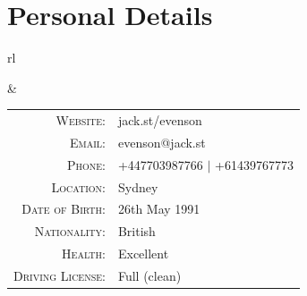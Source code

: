 \section*{Personal Details}

\begin{tabular}{rl}


&

\begin{tabular}{rl}
\textsc{Website:} & jack.st/evenson \\
\textsc{Email:} & evenson@jack.st \\
\textsc{Phone:} & +447703987766 $|$ +61439767773\\
\textsc{Location:} & Sydney \\
\textsc{Date of Birth:} & 26th May 1991 \\
\textsc{Nationality:} & British \\
\textsc{Health:} & Excellent \\
\textsc{Driving License:} & Full (clean)
\end{tabular}

\end{tabular}